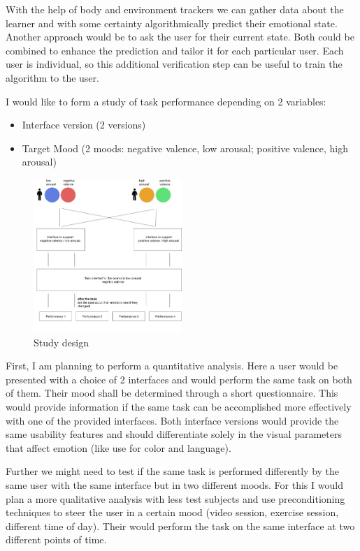 With the help of body and environment trackers we can gather data about the learner and with some certainty algorithmically predict their emotional state. Another approach would be to ask the user for their current state. Both could be combined to enhance the prediction and tailor it for each particular user. Each user is individual, so this additional verification step can be useful to train the algorithm to the user.

I would like to form a study of task performance depending on 2 variables:
\begin{itemize}
	\item Interface version (2 versions)
	\item Target Mood (2 moods: negative valence, low arousal; positive valence, high arousal)
\end{itemize}

\begin{figure}
	\begin{center}
		\includegraphics[width=0.5\textwidth]{images/study_design.png}
		\caption{Study design\label{fig:scaled_diss}}
	\end{center}
\end{figure}



First, I am planning to perform a quantitative analysis. Here a user would be presented with a choice of 2 interfaces and would perform the same task on both of them. Their mood shall be determined through a short questionnaire.
This would provide information if the same task can be accomplished more effectively with one of the provided interfaces. Both interface versions would provide the same usability features and should differentiate solely in the visual parameters that affect emotion (like use for color and language).

Further we might need to test if the same task is performed differently by the same user with the same interface but in two different moods. For this I would plan a more qualitative analysis with less test subjects and use preconditioning techniques to steer the user in a certain mood (video session, exercise session, different time of day). Their would perform the task on the same interface at two different points of time.

